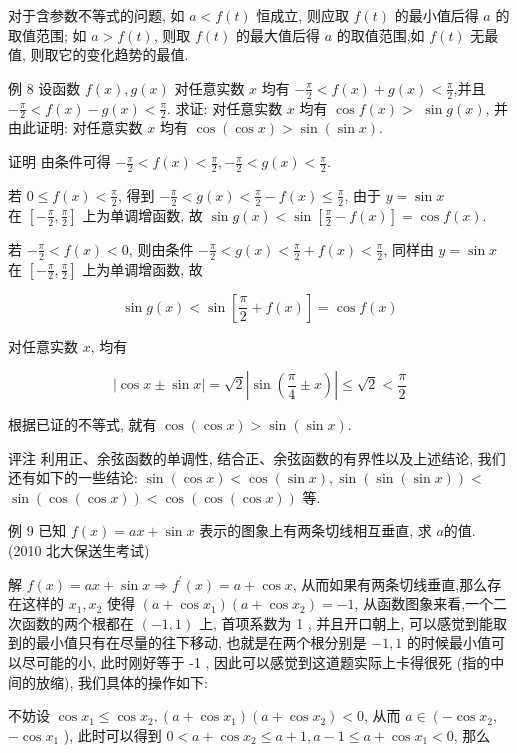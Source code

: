\begin{note}
	对于含参数不等式的问题, 如 $a<f(t)$ 恒成立, 则应取 $f(t)$ 的最小值后得 $a$ 的取值范围; 如 $a>f(t)$, 则取 $f(t)$ 的最大值后得 $a$ 的取值范围,如 $f(t)$ 无最值, 则取它的变化趋势的最值.
\end{note}

例 8 设函数 $f(x), g(x)$ 对任意实数 $x$ 均有 $-\frac{\pi}{2}<f(x)+g(x)<\frac{\pi}{2}$,并且 $-\frac{\pi}{2}<f(x)-g(x)<\frac{\pi}{2}$. 求证: 对任意实数 $x$ 均有 $\cos f(x)>$ $\sin g(x)$, 并由此证明: 对任意实数 $x$ 均有 $\cos (\cos x)>\sin (\sin x)$.

证明 由条件可得 $-\frac{\pi}{2}<f(x)<\frac{\pi}{2},-\frac{\pi}{2}<g(x)<\frac{\pi}{2}$.

若 $0 \leqslant f(x)<\frac{\pi}{2}$, 得到 $-\frac{\pi}{2}<g(x)<\frac{\pi}{2}-f(x) \leqslant \frac{\pi}{2}$, 由于 $y=\sin x$\\
在 $\left[-\frac{\pi}{2}, \frac{\pi}{2}\right]$ 上为单调增函数, 故 $\sin g(x)<\sin \left[\frac{\pi}{2}-f(x)\right]=\cos f(x)$.

若 $-\frac{\pi}{2}<f(x)<0$, 则由条件 $-\frac{\pi}{2}<g(x)<\frac{\pi}{2}+f(x)<\frac{\pi}{2}$, 同样由 $y=\sin x$ 在 $\left[-\frac{\pi}{2}, \frac{\pi}{2}\right]$ 上为单调增函数, 故

$$
	\sin g(x)<\sin \left[\frac{\pi}{2}+f(x)\right]=\cos f(x)
$$

对任意实数 $x$, 均有

$$
	|\cos x \pm \sin x|=\sqrt{2}\left|\sin \left(\frac{\pi}{4} \pm x\right)\right| \leqslant \sqrt{2}<\frac{\pi}{2}
$$

根据已证的不等式, 就有 $\cos (\cos x)>\sin (\sin x)$.

评注 利用正、余弦函数的单调性, 结合正、余弦函数的有界性以及上述结论, 我们还有如下的一些结论: $\sin (\cos x)<\cos (\sin x), \sin (\sin (\sin x))<$ $\sin (\cos (\cos x))<\cos (\cos (\cos x))$ 等.

例 9 已知 $f(x)=a x+\sin x$ 表示的图象上有两条切线相互垂直, 求 $a$的值. (2010 北大保送生考试)

解 $f(x)=a x+\sin x \Rightarrow f^{\prime}(x)=a+\cos x$, 从而如果有两条切线垂直,那么存在这样的 $x_{1}, x_{2}$ 使得 $\left(a+\cos x_{1}\right)\left(a+\cos x_{2}\right)=-1$, 从函数图象来看,一个二次函数的两个根都在 $(-1,1)$ 上, 首项系数为 1 , 并且开口朝上, 可以感觉到能取到的最小值只有在尽量的往下移动, 也就是在两个根分别是 $-1,1$ 的时候最小值可以尽可能的小, 此时刚好等于 -1 , 因此可以感觉到这道题实际上卡得很死 (指的中间的放缩), 我们具体的操作如下:

不妨设 $\cos x_{1} \leqslant \cos x_{2},\left(a+\cos x_{1}\right)\left(a+\cos x_{2}\right)<0$, 从而 $a \in\left(-\cos x_{2}\right.$, $-\cos x_{1}$ ), 此时可以得到 $0<a+\cos x_{2} \leqslant a+1, a-1 \leqslant a+\cos x_{1}<0$, 那么

